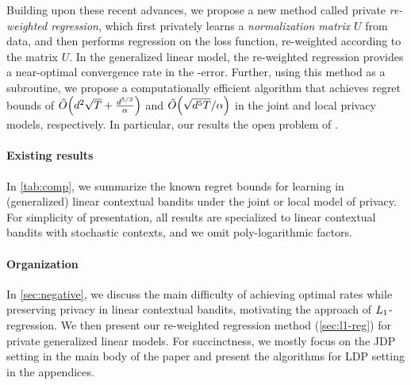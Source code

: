 \documentclass{article}
\begin{document}
Building upon these recent advances, we propose a new method called private \emph{re-weighted regression}, which first privately learns a \emph{normalization matrix} $U$ from data, and then performs regression on the loss function, re-weighted according to the matrix $U$. In the generalized linear model, the re-weighted regression provides a near-optimal convergence rate in the \Lone-error. Further, using this method as a subroutine, we propose a computationally efficient algorithm that achieves regret bounds of $\tilde{O}{\left( d^2\sqrt{T}+\frac{d^{5/2}}{\alpha} \right)}$ and $\tilde{O}{\left( \sqrt{d^5T}/\alpha \right)}$ in the joint and local privacy models, respectively. 
In particular, our results  the open problem of \citet{azize2024open}.


\paragraph{Existing results}
In \cref{tab:comp}, we summarize the known regret bounds for learning in (generalized) linear contextual bandits under the joint or local model of privacy. For simplicity of presentation, all results are specialized to linear contextual bandits with stochastic contexts, and we omit poly-logarithmic factors. 

\paragraph{Organization}
In \cref{sec:negative}, we discuss the main difficulty of achieving optimal rates while preserving privacy in linear contextual bandits, motivating the approach of $L_1$-regression. We then present our re-weighted regression method (\cref{sec:l1-reg}) for private generalized linear models. 
For succinctness, we mostly focus on the JDP setting in the main body of the paper and present the algorithms for LDP setting in the appendices.
\end{document}
